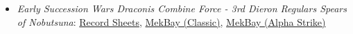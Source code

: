 \begin{itemize}
\item \emph{Early Succession Wars Draconis Combine Force - 3rd Dieron Regulars Spears of Nobutsuna}: \href{https://raw.githubusercontent.com/Eudicods/outworlds-wastes/rules-pdf/draconis-combine.pdf}{Record Sheets}, \href{https://mekbay.com/?units=Outworlds%20Wastes~BMWarhammer_WHM6Rk:3:4,BMWolverine_WVR6K,BMKintaro_KTO19,BMDragon_DRG1N,BMStinger_STG3Gb:5:5,BMLocust_LCT1Vb:5:5,AFTrident_TRN3T,CVSabakuKazeHeavyScoutHoverTank:4:4,CVSabakuKazeHeavyScoutHoverTank:4:4,CVHeavyHoverAPC,CIFootPlatoonAntiMech_Rifle,CIFootPlatoonAntiMech_Rifle&name=3rd%20Dieron%20Regulars%20Spears%20of%20Nobutsuna&gs=cbt}{MekBay (Classic)}, \href{https://mekbay.com/?units=Outworlds%20Wastes~BMWarhammer_WHM6Rk:3:4,BMWolverine_WVR6K,BMKintaro_KTO19,BMDragon_DRG1N,BMStinger_STG3Gb:5:5,BMLocust_LCT1Vb:5:5,AFTrident_TRN3T,CVSabakuKazeHeavyScoutHoverTank:4:4,CVSabakuKazeHeavyScoutHoverTank:4:4,CVHeavyHoverAPC,CIFootPlatoonAntiMech_Rifle,CIFootPlatoonAntiMech_Rifle&name=3rd%20Dieron%20Regulars%20Spears%20of%20Nobutsuna&gs=as}{MekBay (Alpha Strike)}

\end{itemize}
